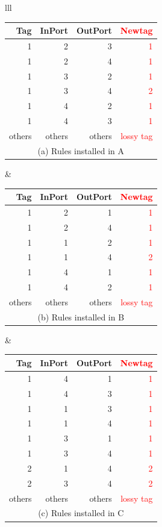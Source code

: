 \begin{table}[t]
\small
	\footnotesize
	\centering
	\begin{tabular}{lll}
		\begin{tabular}{|r|r|r|r|}
			\hline
			Tag&  InPort& OutPort & \textcolor{red}{Newtag} \\
			\hline
			\hline
			1 & 2 & 3 & \textcolor{red}{1} \\
			\hline
			1 & 2 & 4 & \textcolor{red}{1} \\
			\hline
			1 & 3 & 2 & \textcolor{red}{1} \\
			\hline
			1 & 3 & 4 & \textcolor{red}{2} \\
			\hline
			1 & 4 & 2 & \textcolor{red}{1} \\
			\hline
			1 & 4 & 3 & \textcolor{red}{1} \\
			\hline
			others & others & others & \textcolor{red}{lossy tag} \\
			\hline
			\multicolumn{4}{c}{(a) Rules installed in A} \\
		\end{tabular}
		&
		\begin{tabular}{|r|r|r|r|}
			\hline
			Tag&  InPort& OutPort & \textcolor{red}{Newtag} \\
			\hline
			\hline
			1 & 2 & 1 & \textcolor{red}{1} \\
			\hline
			1 & 2 & 4 & \textcolor{red}{1} \\
			\hline
			1 & 1 & 2 & \textcolor{red}{1} \\
			\hline
			1 & 1 & 4 & \textcolor{red}{2} \\
			\hline
			1 & 4 & 1 & \textcolor{red}{1} \\
			\hline
			1 & 4 & 2 & \textcolor{red}{1} \\
			\hline
			others & others & others & \textcolor{red}{lossy tag} \\
			\hline
			\multicolumn{4}{c}{(b) Rules installed in B} \\
		\end{tabular}
		&
		
		\begin{tabular}{|r|r|r|r|}
			\hline
			Tag&  InPort& OutPort & \textcolor{red}{Newtag} \\
			\hline
			\hline
			1 & 4 & 1 & \textcolor{red}{1} \\
			\hline
			1 & 4 & 3 & \textcolor{red}{1} \\
			\hline
			1 & 1 & 3 & \textcolor{red}{1} \\
			\hline
			1 & 1 & 4 & \textcolor{red}{1} \\
			\hline
			1 & 3 & 1 & \textcolor{red}{1} \\
			\hline
			1 & 3 & 4 & \textcolor{red}{1} \\
			\hline
			2 & 1 & 4 & \textcolor{red}{2} \\
			\hline
			2 & 3 & 4 & \textcolor{red}{2} \\
			\hline
			others & others & others & \textcolor{red}{lossy tag} \\
			\hline
			\multicolumn{4}{c}{(c) Rules installed in C} \\
		\end{tabular}
		

\end{tabular}
\end{table}
